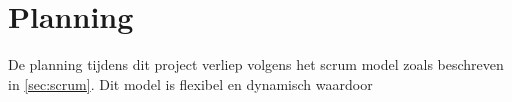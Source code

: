 \section{Planning}
De planning tijdens dit project verliep volgens het scrum model zoals beschreven in \autoref{sec:scrum}. Dit model is flexibel en dynamisch waardoor 